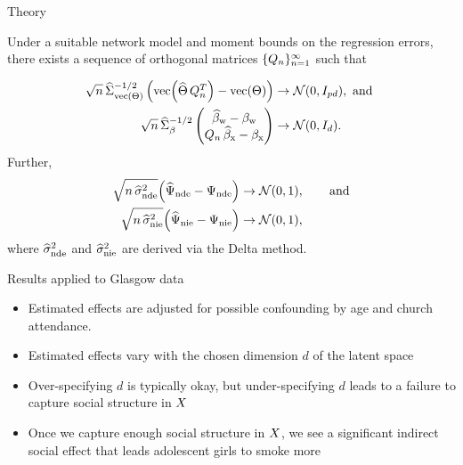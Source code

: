 \documentclass[final]{beamer}
\newlength{\colwidth}
\begin{document}
\begin{frame}[t]
\begin{columns}[t]
\begin{column}{\colwidth}
      \begin{exampleblock}{Theory}

        Under a suitable network model and moment bounds on the regression errors, there exists a sequence of orthogonal matrices $\{Q_n\}_{n=1}^\infty$ such that

        \begin{equation*}
          \begin{aligned}
            \sqrt{ n } \,
            \Sigmahattheta^{-1/2}
            \begin{pmatrix}
              \vecc \paren*{\Thetahat \, Q_n^T} - \Thetavec
            \end{pmatrix}
             & \to
            \Normal{0}{I_{p d}}, \text{ and } \\
            \sqrt{ n } \,
            \Sigmahatbeta^{-1/2}
            \begin{pmatrix}
              \betawhat - \betaw \\
              Q_n \, \betaxhat - \betax
            \end{pmatrix}
             & \to
            \Normal{0}{I_d}.
          \end{aligned}
        \end{equation*}
        Further,
        \begin{align*}
          \sqrt{n \, \sigmahatnde} \paren*{\ndehat - \nde}
            &\to
          \Normal{0}{1}, \qquad \text{and} \\
          \sqrt{n \, \sigmahatnie} \paren*{\niehat - \nie}
           &\to
          \Normal{0}{1},
        \end{align*}
        where $\widehat{\sigma}^2_\mathrm{nde}$ and $\widehat{\sigma}^2_\mathrm{nie}$ are derived via the Delta method.

      \end{exampleblock}

      \begin{block}{Results applied to Glasgow data}

        
        \begin{minipage}{.4\textwidth}

          \begin{itemize}
            \item Estimated effects are adjusted for possible confounding by age and church attendance.
            \item Estimated effects vary with the chosen dimension $d$ of the latent space
            \item Over-specifying $d$ is typically okay, but under-specifying $d$ leads to a failure to capture social structure in $X$
            \item Once we capture enough social structure in $X$, we see a significant indirect social effect that leads adolescent girls to smoke more
          \end{itemize}


\end{minipage}
\end{block}
\end{column}
\end{columns}
\end{frame}
\end{document}
